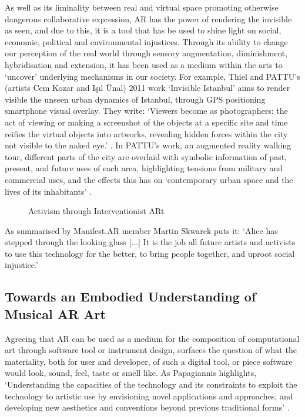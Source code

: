 As well as its liminality between real and virtual space promoting otherwise dangerous collaborative expression, AR has the power of rendering the invisible as seen, and due to this, it is a tool that has be used to shine light on social, economic, political and environmental injustices. Through its ability to change our perception of the real world through sensory augmentation, diminishment, hybridisation and extension, it has been used as a medium within the arts to `uncover' underlying mechanisms in our society. For example, Thiel and PATTU's (artists Cem Kozar and Işıl Ünal) 2011 work `Invisible Istanbul' aims to render visible the unseen urban dynamics of Istanbul, through GPS positioning smartphone visual overlay. They write: `Viewers become as photographers: the act of viewing or making a screenshot of the objects at a specific site and time reifies the virtual objects into artworks, revealing hidden forces within the city not visible to the naked eye.' \citeyearpar{thiel2011}. In PATTU's work, an augmented reality walking tour, different parts of the city are overlaid with symbolic information of past, present, and future uses of each area, highlighting tensions from military and commercial uses, and the effects this has on `contemporary urban space and the lives of its inhabitants' \citeyearpar{thiel2018}.

\begin{figure}
    \centering
    \caption{Activism through Interventionist ARt}
    \label{fig: activismARt}
\end{figure}


As summarised by Manifest.AR member Martin Skwarek puts it: `Alice has stepped through the looking glass [...] It is the job all future artists and activists to use this technology for the better, to bring people together, and uproot social injustice.' \citeyearpar{skwarek2018}



\subsection{Towards an Embodied Understanding of Musical AR Art}\label{sec: ar-arts-designingart}
Agreeing that AR can be used as a medium for the composition of computational art through software tool or instrument design, surfaces the question of what the materiality, both for user and developer, of such a digital tool, or piece software would look, sound, feel, taste or smell like. As Papagiannis highlights, `Understanding the capacities of the technology and its constraints to exploit the technology to artistic use by envisioning novel applications and approaches, and developing new aesthetics and conventions beyond previous traditional forms' \citeyearpar{papagiannis2017}.


